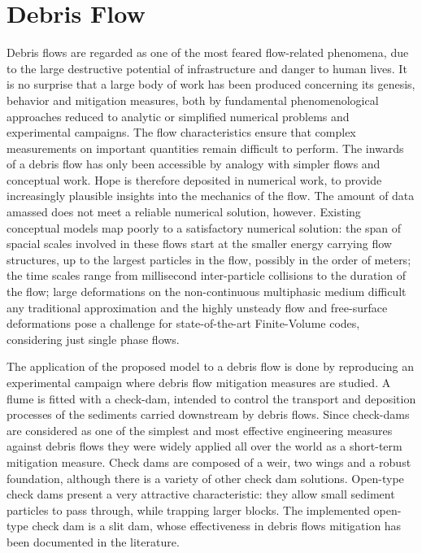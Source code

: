 \clearpage
\section{Debris Flow}
\label{sec:debris_flow}

Debris flows are regarded as one of the most feared flow-related phenomena, due to the large destructive potential of infrastructure and danger to human lives. It is no surprise that a large body of work has been produced concerning its genesis, behavior and mitigation measures, both by fundamental phenomenological approaches reduced to analytic or simplified numerical problems and experimental campaigns. The flow characteristics ensure that complex measurements on important quantities remain difficult to perform. The inwards of a debris flow has only been accessible by analogy with simpler flows and conceptual work. Hope is therefore deposited in numerical work, to provide increasingly plausible insights into the mechanics of the flow. The amount of data amassed does not meet a reliable numerical solution, however. Existing conceptual models map poorly to a satisfactory numerical solution: the span of spacial scales involved in these flows start at the smaller energy carrying flow structures, up to the largest particles in the flow, possibly in the order of meters; the time scales range from millisecond inter-particle collisions to the duration of the flow; large deformations on the non-continuous multiphasic medium difficult any traditional approximation and the highly unsteady flow and free-surface deformations pose a challenge for state-of-the-art Finite-Volume codes, considering just single phase flows.

The application of the proposed model to a debris flow is done by reproducing an experimental campaign where debris flow mitigation measures are studied. A flume is fitted with a check-dam, intended to control the transport and deposition processes of the sediments carried downstream by debris flows. Since check-dams are considered as one of the simplest and most effective engineering measures against debris flows \citep{Zeng-2008,Remaitre-2008} they were widely applied all over the world as a short-term mitigation measure. Check dams are composed of a weir, two wings and a robust foundation, although there is a variety of other check dam solutions. Open-type check dams present a very attractive characteristic: they allow small sediment particles to pass through, while trapping larger blocks. The implemented open-type check dam is a slit dam, whose effectiveness in debris flows mitigation has been documented in the literature. 

